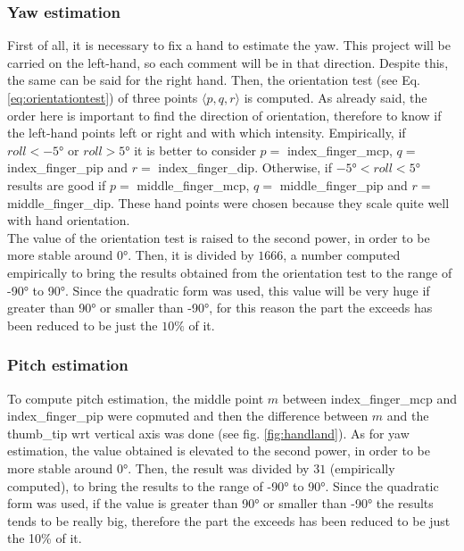 \subsubsection{Yaw estimation}
\label{subsec:yaw}
First of all, it is necessary to fix a hand to estimate the yaw. This project will be carried on the left-hand, so each comment will be in that direction. Despite this, the same can be said for the right hand. Then, the orientation test (see Eq. \ref{eq:orientationtest}) of three points $\langle p, q, r \rangle$ is computed. As already said, the order here is important to find the direction of orientation, therefore to know if the left-hand points left or right and with which intensity. Empirically, if $roll < \ang{-5}$ or $roll > \ang{+5}$ it is better to consider $p=$ index\_finger\_mcp, $q=$ index\_finger\_pip and $r=$ index\_finger\_dip. Otherwise, if $\ang{-5} < roll < \ang{+5}$ results are good if $p=$ middle\_finger\_mcp, $q=$ middle\_finger\_pip and $r=$ middle\_finger\_dip. These hand points were chosen because they scale quite well with hand orientation. \\

\noindent The value of the orientation test is raised to the second power, in order to be more stable around \ang{0}. Then, it is divided by $1666$, a number computed empirically to bring the results obtained from the orientation test to the range of \ang{-90} to \ang{+90}. Since the quadratic form was used, this value will be very huge if greater than \ang{+90} or smaller than \ang{-90}, for this reason the part the exceeds has been reduced to be just the $10\%$ of it.

\subsubsection{Pitch estimation}
\label{subsec:pitch}
To compute pitch estimation, the middle point $m$ between index\_finger\_mcp and index\_finger\_pip were copmuted and then the difference between $m$ and the thumb\_tip \gls{wrt} vertical axis was done (see fig. \ref{fig:handland}). As for yaw estimation, the value obtained is elevated to the second power, in order to be more stable around \ang{0}. Then, the result was divided by $31$ (empirically computed), to bring the results to the range of \ang{-90} to \ang{90}. Since the quadratic form was used, if the value is greater than \ang{90} or smaller than \ang{-90} the results tends to be really big, therefore the part the exceeds has been reduced to be just the 10\% of it.

